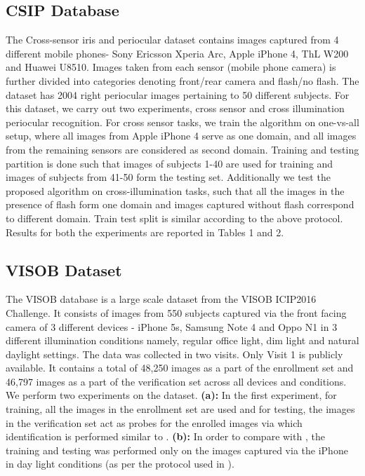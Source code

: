 \documentclass[10pt,twocolumn,letterpaper]{article}
\begin{document}
\subsection{CSIP Database}
  \vspace{-4pt}
The Cross-sensor iris and periocular dataset \cite{santos2015fusing} contains images captured from 4 different mobile phones- Sony Ericsson Xperia Arc, Apple iPhone 4, ThL W200 and Huawei U8510. Images taken from each sensor (mobile phone camera) is further divided into categories denoting front/rear camera and flash/no flash.  The dataset has 2004 right periocular images pertaining to 50 different subjects.
For this dataset, we carry out two experiments, cross sensor and cross illumination periocular recognition. For cross sensor tasks, we train the algorithm on one-vs-all setup, where all images from Apple iPhone 4 serve as one domain, and all images from the remaining sensors are considered as second domain. Training and testing partition is done such that images of subjects 1-40 are used for training and images of subjects from 41-50 form the testing set. 
Additionally we test the proposed algorithm on cross-illumination tasks, such that all the images in the presence of flash form one domain and images captured without flash correspond to different domain. Train test split is similar according to the above protocol.
Results for both the experiments are reported in Tables 1 and 2.



\subsection{VISOB Dataset}
\label{visob}
  \vspace{-4pt}
The VISOB database \cite{VISOB_Dataset} is a large scale dataset from the VISOB ICIP2016 Challenge. It consists of images from 550 subjects captured via the front facing camera of 3 different devices - iPhone 5s, Samsung Note 4 and Oppo N1 in 3 different illumination conditions namely, regular office light, dim light and natural daylight settings. The data was collected in two visits. Only Visit 1 is publicly available. It contains a total of 48,250 images as a part of the enrollment set and 46,797 images as a part of the verification set across all devices and conditions. We perform two experiments on the dataset. \textbf{(a):} In the first experiment, for training, all the images in the enrollment set are used and for testing, the images in the verification set act as probes for the enrolled images via which identification is performed similar to \cite{ahuja2017convolutional}. \textbf{(b):} In order to compare with \cite{zhao2018improving}, the training and testing was performed only on the images captured via the iPhone in day light conditions (as per the protocol used in \cite{zhao2018improving}). 
\end{document}
